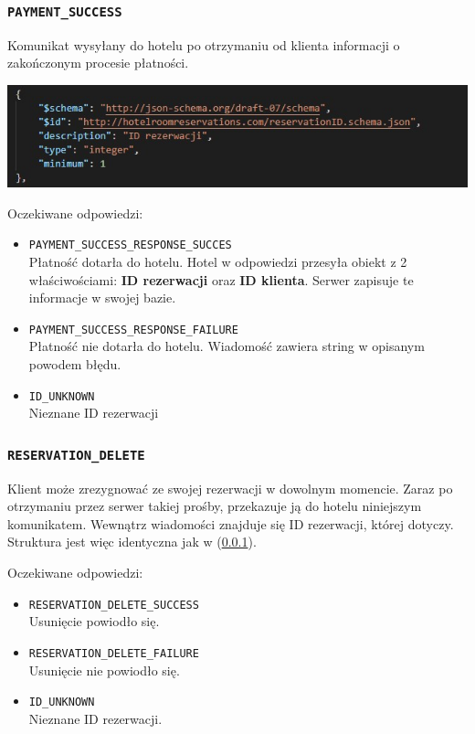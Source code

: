 \documentclass{article}
\begin{document}
\subsubsection{\texttt{PAYMENT\_SUCCESS}} \label{payment_success}
Komunikat wysyłany do hotelu po otrzymaniu od klienta informacji o zakończonym procesie płatności.

\includegraphics[width=\linewidth]{Rezerwacje/reservationIDSchema.jpg}

Oczekiwane odpowiedzi:
\begin{itemize}
    \item \texttt{PAYMENT\_SUCCESS\_RESPONSE\_SUCCES}\\
    Płatność dotarła do hotelu. Hotel w odpowiedzi przesyła obiekt z 2 właściwościami: \textbf{ID rezerwacji} oraz \textbf{ID klienta}. Serwer zapisuje te informacje w swojej bazie.
    \item \texttt{PAYMENT\_SUCCESS\_RESPONSE\_FAILURE}\\
    Płatność nie dotarła do hotelu. Wiadomość zawiera string w opisanym powodem błędu.
    \item \texttt{ID\_UNKNOWN}\\
    Nieznane ID rezerwacji
\end{itemize}

\subsubsection{\texttt{RESERVATION\_DELETE}}
    Klient może zrezygnować ze swojej rezerwacji w dowolnym momencie. Zaraz po otrzymaniu przez serwer takiej prośby, przekazuje ją do hotelu niniejszym komunikatem. Wewnątrz wiadomości znajduje się ID rezerwacji, której dotyczy. Struktura jest więc identyczna jak w (\ref{payment_success}).
    
Oczekiwane odpowiedzi:
\begin{itemize}
    \item \texttt{RESERVATION\_DELETE\_SUCCESS}\\
    Usunięcie powiodło się.
    \item \texttt{RESERVATION\_DELETE\_FAILURE}\\
    Usunięcie nie powiodło się.
    \item \texttt{ID\_UNKNOWN}\\
    Nieznane ID rezerwacji.
\end{itemize}
\end{document}
